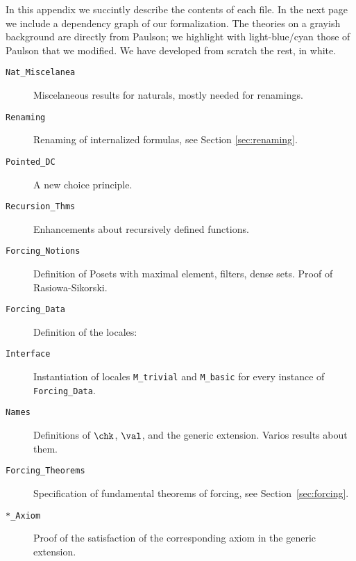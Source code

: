 In this appendix we succintly describe the contents of each file. In
the next page we include a dependency graph of our formalization. The
theories on a grayish background are directly from Paulson; we
highlight with light-blue/cyan those of Paulson that we modified. We
have developed from scratch the rest, in white.

\begin{description}
\item[\texttt{Nat\_Miscelanea}]Miscelaneous results for naturals, mostly
  needed for renamings.
\item[\texttt{Renaming}] Renaming of internalized formulas, see
  Section \ref{sec:renaming}.
\item[\texttt{Pointed\_DC}] A new choice principle.
\item[\texttt{Recursion\_Thms}] Enhancements about recursively defined
  functions.
\item[\texttt{Forcing\_Notions}] Definition of Posets with maximal
  element, filters, dense sets. Proof of Rasiowa-Sikorski.
\item[\texttt{Forcing\_Data}] Definition of the locales:
\item[\texttt{Interface}] Instantiation of locales \texttt{M\_trivial}
  and \texttt{M\_basic} for every instance of \texttt{Forcing\_Data}.
\item[\texttt{Names}] Definitions of $\chk$, $\val$, and the generic
  extension. Varios results about them.
\item[\texttt{Forcing\_Theorems}] Specification of fundamental
  theorems of forcing, see Section~\ref{sec:forcing}.
\item[\texttt{*\_Axiom}] Proof of the satisfaction of the
  corresponding axiom in the generic extension.
\end{description}




